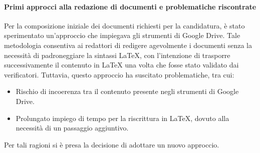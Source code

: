 \documentclass{article}
\begin{document}
    \paragraph*{Primi approcci alla redazione di documenti e problematiche riscontrate}
    Per la composizione iniziale dei documenti richiesti per la candidatura, è stato sperimentato un'approccio che impiegava gli strumenti di Google Drive. Tale metodologia consentiva ai redattori di redigere agevolmente i documenti senza la necessità di padroneggiare la sintassi LaTeX, con l'intenzione di trasporre successivamente il contenuto in LaTeX una volta che fosse stato validato dai verificatori. Tuttavia, questo approccio ha suscitato problematiche, tra cui:
    \begin{itemize}
        \item Rischio di incoerenza tra il contenuto presente negli strumenti di Google Drive.
        \item Prolungato impiego di tempo per la riscrittura in LaTeX, dovuto alla necessità di un passaggio aggiuntivo. 
    \end{itemize}
    Per tali ragioni si è presa la decisione di adottare un nuovo approccio.
\end{document}
